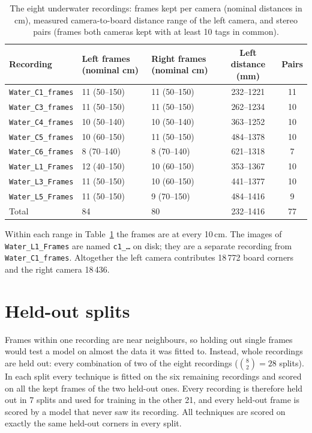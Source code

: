 \begin{table}[H]
\centering
\caption{The eight underwater recordings: frames kept per camera (nominal distances in cm), measured
camera-to-board distance range of the left camera, and stereo pairs (frames both cameras kept with at least 10
tags in common).}
\label{tab:app:recordings}
\small
\begin{tabular}{lllcc}
\toprule
Recording & Left frames (nominal cm) & Right frames (nominal cm) & Left distance (mm) & Pairs \\
\midrule
\texttt{Water\_C1\_frames} & 11 (50--150)          & 11 (50--150)          & 232--1221 & 11 \\
\texttt{Water\_C3\_frames} & 11 (50--150)          & 11 (50--150)          & 262--1234 & 10 \\
\texttt{Water\_C4\_frames} & 10 (50--140)          & 10 (50--140)          & 363--1252 & 10 \\
\texttt{Water\_C5\_frames} & 10 (60--150)          & 11 (50--150)          & 484--1378 & 10 \\
\texttt{Water\_C6\_frames} &  8 (70--140)          &  8 (70--140)          & 621--1318 &  7 \\
\texttt{Water\_L1\_Frames} & 12 (40--150)          & 10 (60--150)          & 353--1367 & 10 \\
\texttt{Water\_L3\_Frames} & 11 (50--150)          & 10 (60--150)          & 441--1377 & 10 \\
\texttt{Water\_L5\_Frames} & 11 (50--150)          &  9 (70--150)          & 484--1416 &  9 \\
\midrule
Total                      & 84                    & 80                    & 232--1416 & 77 \\
\bottomrule
\end{tabular}
\end{table}

Within each range in Table~\ref{tab:app:recordings} the frames are at every 10\,cm. The images of
\texttt{Water\_L1\_Frames} are named \texttt{c1\_\ldots} on disk; they are a separate recording from
\texttt{Water\_C1\_frames}. Altogether the left camera contributes 18\,772 board corners and the right camera
18\,436.

\section{Held-out splits}
\label{app:heldout:splits}

Frames within one recording are near neighbours, so holding out single frames would test a model on almost the
data it was fitted to. Instead, whole recordings are held out: every combination of two of the eight recordings
($\binom{8}{2} = 28$ splits). In each split every technique is fitted on the six remaining recordings and scored
on all the kept frames of the two held-out ones. Every recording is therefore held out in 7 splits and used for
training in the other 21, and every held-out frame is scored by a model that never saw its recording. All
techniques are scored on exactly the same held-out corners in every split.

